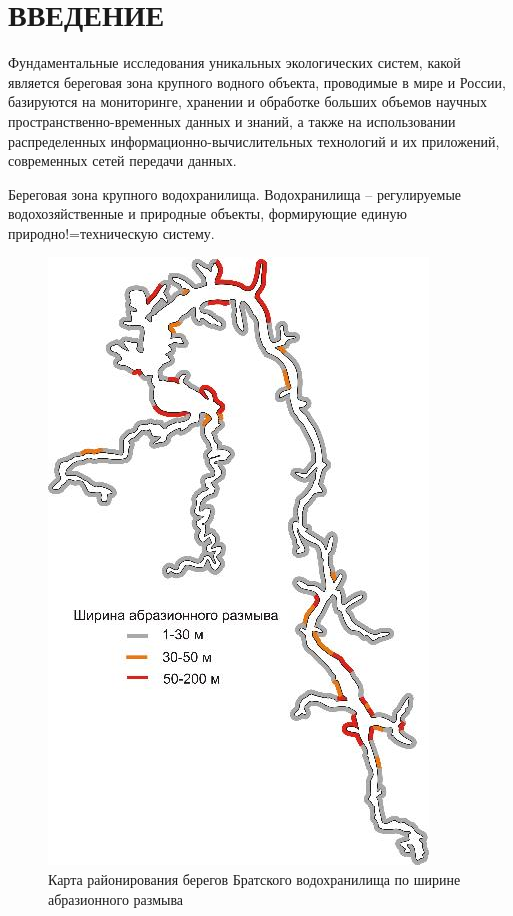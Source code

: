 \documentclass[732,fontsize=14pt,final]{studrep}
\begin{document}
\setcounter{page}{2}
\tableofcontents
\chapter*{ВВЕДЕНИЕ}
\label{chap:intro}

Фундаментальные исследования уникальных экологических систем, какой является береговая зона крупного водного объекта, проводимые в мире и России, базируются на мониторинге, хранении и обработке больших объемов научных пространственно-временных данных и знаний, а также на использовании распределенных информационно-вычислительных технологий и их приложений, современных сетей передачи данных.

Береговая зона крупного водохранилища. Водохранилища – регулируемые водохозяйственные и природные объекты, формирующие единую природно!=техническую систему.

  \begin{figure}[htp]
	\centering
    \includegraphics[width=0.8\linewidth]{pics/image13.png}
    \caption{Карта районирования берегов Братского водохранилища по ширине абразионного размыва}
    \label{fig:bratsk-res}
  \end{figure}
\end{document}
